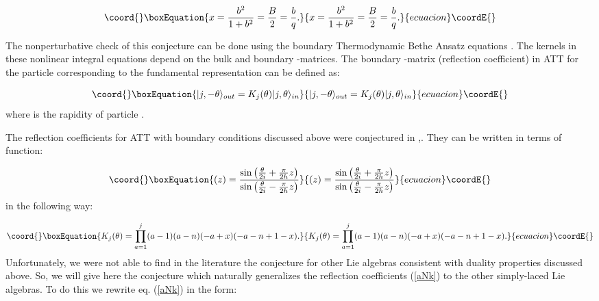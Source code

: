 \documentclass[a4paper,12pt]{article}
\begin{document}
\begin{equation}\coord{}\boxEquation{
x=\frac{b^2}{1+b^2}=\frac{B}{2}=\frac bq.  \label{xB}
}{
x=\frac{b^2}{1+b^2}=\frac{B}{2}=\frac bq.  }{ecuacion}\coordE{}\end{equation}

The nonperturbative check of this conjecture can be done using the boundary
Thermodynamic Bethe Ansatz equations \cite{SSM}. The kernels in these
nonlinear integral equations depend on the bulk and boundary \coordHE{}-matrices.
The boundary \coordHE{}-matrix (reflection coefficient) in ATT for the particle \coordHE{}
corresponding to the fundamental representation \coordHE{} can be defined
as:

\begin{equation}\coord{}\boxEquation{
|j,-\theta \rangle _{out}=K_j(\theta )|j,\theta \rangle _{in}  \label{kI}
}{
|j,-\theta \rangle _{out}=K_j(\theta )|j,\theta \rangle _{in}  }{ecuacion}\coordE{}\end{equation}
where \myHighlight{$\theta $}\coordHE{} is the rapidity of particle \coordHE{}.

The reflection coefficients for \coordHE{} ATT with boundary conditions
discussed above were conjectured in \cite{CODS},\cite{DELG}. They can be
written in terms of function:

\begin{equation}\coord{}\boxEquation{
\left( z\right) =\frac{\sin \left( \frac \theta {2i}+\frac \pi {2h}z\right) 
}{\sin \left( \frac \theta {2i}-\frac \pi {2h}z\right) }  \label{Z}
}{
\left( z\right) =\frac{\sin \left( \frac \theta {2i}+\frac \pi {2h}z\right) 
}{\sin \left( \frac \theta {2i}-\frac \pi {2h}z\right) }  }{ecuacion}\coordE{}\end{equation}
in the following way:

\begin{equation}\coord{}\boxEquation{
K_j(\theta )=\prod\limits_{a=1}^j(a-1)(a-n)(-a+x)(-a-n+1-x).  \label{aNk}
}{
K_j(\theta )=\prod\limits_{a=1}^j(a-1)(a-n)(-a+x)(-a-n+1-x).  }{ecuacion}\coordE{}\end{equation}
Unfortunately, we were not able to find in the literature the conjecture for
other Lie algebras consistent with duality properties
discussed above. 
So, we will give here the conjecture which naturally
generalizes the reflection coefficients (\ref{aNk}) to the other
simply-laced Lie algebras. To do this we rewrite eq. (\ref{aNk}) in the form:
\end{document}
